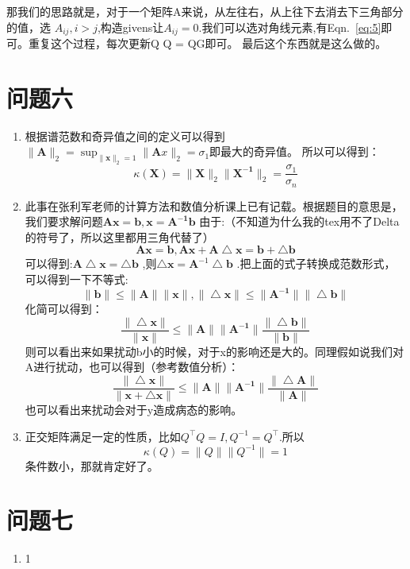 \documentclass[answers]{exam}  %
\begin{document}
\begin{enumerate}[label=\alph*.]
    那我们的思路就是，对于一个矩阵A来说，从左往右，从上往下去消去下三角部分的值，选
    $A_{ij},i>j$,构造givens让$A_{ij}=0$.我们可以选对角线元素,有Eqn.~\ref{eq:5}即可。重复这个过程，每次更新Q
    Q = QG即可。
    最后这个东西就是这么做的。

\end{enumerate}

\section{问题六}
\begin{enumerate}[label=\alph*.] 
    \item 根据谱范数和奇异值之间的定义可以得到$\|\mathbf{A}\|_2 = \sup_{\|\mathbf{x}\|_2 = 1} \|\mathbf{A}x\|_2 = \sigma_1$即最大的奇异值。
    所以可以得到：
    \begin{equation*}
        \kappa(\mathbf{X}) =  \|\mathbf{X}\|_2 \|\mathbf{X^{-1}}\|_2 = \frac{\sigma_1}{\sigma_n}
    \end{equation*}
    \item 此事在张利军老师的计算方法和数值分析课上已有记载。根据题目的意思是，我们要求解问题$\mathbf{Ax} = \mathbf{b},\mathbf{x} = \mathbf{A^{-1}b}$
    由于:（不知道为什么我的tex用不了Delta的符号了，所以这里都用三角代替了）
    \begin{equation*}
        \mathbf{Ax} = \mathbf{b}, \mathbf{Ax+ A \bigtriangleup x} = \mathbf{b+ \bigtriangleup b}
    \end{equation*}
    可以得到:$\mathbf{A}\bigtriangleup \mathbf{x} = \bigtriangleup\mathbf{b}$
    ,则$\bigtriangleup  \mathbf{x}  = \mathbf{A}^{-1}\bigtriangleup\mathbf{b}$
    .把上面的式子转换成范数形式，可以得到一下不等式:
    \begin{equation*}
        \|\mathbf{b}\| \leq \|\mathbf{A}\| \|\mathbf{x}\|, \|\bigtriangleup\mathbf{x} \| \leq \|\mathbf{A^{-1}}\| \|\bigtriangleup\mathbf{b} \| 
    \end{equation*}
    化简可以得到：
    \begin{equation*}
        \frac{ \|\bigtriangleup\mathbf{x} \| }{ \|\mathbf{x} \| } \leq  \|\mathbf{A} \|  \|\mathbf{A^{-1}} \| \frac{ \|\bigtriangleup\mathbf{b} \| }{ \|\mathbf{b} \| } 
    \end{equation*}
    则可以看出来如果扰动b小的时候，对于x的影响还是大的。同理假如说我们对A进行扰动，也可以得到（参考数值分析）：
    \begin{equation*}
        \frac{ \|\bigtriangleup\mathbf{x} \| }{ \|\mathbf{x}+\bigtriangleup\mathbf{x}\| } \leq  \|\mathbf{A} \|  \|\mathbf{A^{-1}} \| \frac{ \|\bigtriangleup\mathbf{A} \| }{ \|\mathbf{A} \| } 
    \end{equation*}
    也可以看出来扰动会对于y造成病态的影响。
    \item 正交矩阵满足一定的性质，比如$Q^\top Q = I,Q^{-1} = Q^\top$.所以
    \begin{equation*}
        \kappa(Q) = \|Q\| \|Q^{-1}\| = 1
    \end{equation*}
    条件数小，那就肯定好了。

\end{enumerate}

\section{问题七}
\begin{enumerate}[label=\alph*.] 
    \item 1
\end{enumerate}
\end{document}
